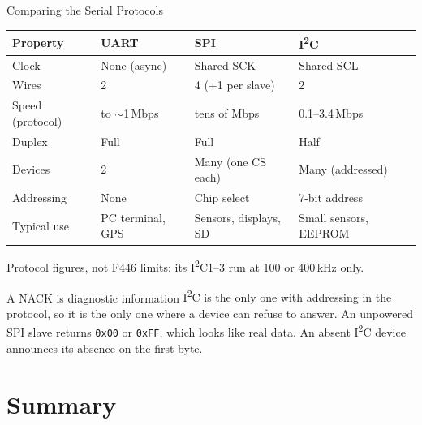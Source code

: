 \documentclass[9pt,aspectratio=169,xcolor=table]{beamer}
\begin{document}
\begin{frame}{Comparing the Serial Protocols}
    \begin{center}
    {\small
    \striped
    \begin{tabular}{@{}l l l l@{}}
        \toprule
        \textbf{Property} & \textbf{UART} & \textbf{SPI} & \textbf{I\textsuperscript{2}C} \\
        \midrule
        Clock & None (async) & Shared SCK & Shared SCL \\
        Wires & 2 & 4 (+1 per slave) & 2 \\
        Speed (protocol) & to $\sim$1\,Mbps & tens of Mbps & 0.1--3.4\,Mbps \\
        Duplex & Full & Full & Half \\
        Devices & 2 & Many (one CS each) & Many (addressed) \\
        Addressing & None & Chip select & 7-bit address \\
        Typical use & PC terminal, GPS & Sensors, displays, SD & Small sensors, EEPROM \\
        \bottomrule
    \end{tabular}}
    \end{center}
    {\scriptsize Protocol figures, not F446 limits: its I\textsuperscript{2}C1--3 run at 100 or 400\,kHz only.}

    \vspace{2mm}
    \begin{block}{A NACK is diagnostic information}
        {\small I\textsuperscript{2}C is the only one with \alert{addressing in the protocol}, so it is the only one where a device can refuse to answer. An unpowered SPI slave returns \texttt{0x00} or \texttt{0xFF}, which looks like real data. An absent I\textsuperscript{2}C device announces its absence on the first byte.}
    \end{block}
\end{frame}


\section{Summary}
\end{document}
